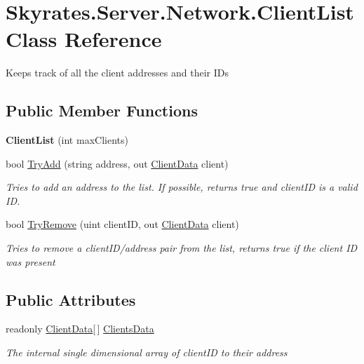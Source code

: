 \hypertarget{class_skyrates_1_1_server_1_1_network_1_1_client_list}{\section{Skyrates.\-Server.\-Network.\-Client\-List Class Reference}
\label{class_skyrates_1_1_server_1_1_network_1_1_client_list}
}


Keeps track of all the client addresses and their I\-Ds  


\subsection*{Public Member Functions}
\begin{DoxyCompactItemize}
\item 
\hypertarget{class_skyrates_1_1_server_1_1_network_1_1_client_list_aa52950234cf21f9eef9522f7a6ff3269}{{\bfseries Client\-List} (int max\-Clients)}\label{class_skyrates_1_1_server_1_1_network_1_1_client_list_aa52950234cf21f9eef9522f7a6ff3269}

\item 
bool \hyperlink{class_skyrates_1_1_server_1_1_network_1_1_client_list_a0625ac11dd72f4da138bd7d5b90e7251}{Try\-Add} (string address, out \hyperlink{class_skyrates_1_1_server_1_1_network_1_1_client_data}{Client\-Data} client)
\begin{DoxyCompactList}\small\item\em Tries to add an address to the list. If possible, returns true and client\-I\-D is a valid I\-D. \end{DoxyCompactList}\item 
bool \hyperlink{class_skyrates_1_1_server_1_1_network_1_1_client_list_a5116345632ab2dba0b87579b72df23d4}{Try\-Remove} (uint client\-I\-D, out \hyperlink{class_skyrates_1_1_server_1_1_network_1_1_client_data}{Client\-Data} client)
\begin{DoxyCompactList}\small\item\em Tries to remove a client\-I\-D/address pair from the list, returns true if the client I\-D was present \end{DoxyCompactList}\end{DoxyCompactItemize}
\subsection*{Public Attributes}
\begin{DoxyCompactItemize}
\item 
readonly \hyperlink{class_skyrates_1_1_server_1_1_network_1_1_client_data}{Client\-Data}\mbox{[}$\,$\mbox{]} \hyperlink{class_skyrates_1_1_server_1_1_network_1_1_client_list_a77c2a652508c16a6e9aaabe2762c9dd1}{Clients\-Data}
\begin{DoxyCompactList}\small\item\em The internal single dimensional array of client\-I\-D to their address \end{DoxyCompactList}\end{DoxyCompactItemize}
